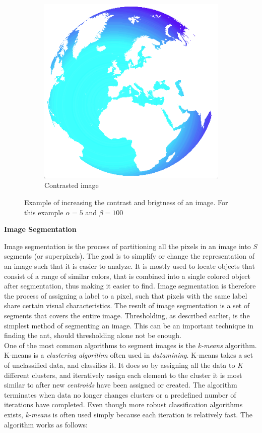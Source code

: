 \begin{figure}
\begin{subfigure}[b]{0.3\textwidth}
                \includegraphics[scale = 0.2]{img/globeContrast}
                \caption{Contrasted image}
        \end{subfigure}
		\caption{Example of increasing the contrast and brigtness of an image. For this example $\alpha = 5$ and $\beta = 100$}
		\label{fig:bright_contrast}
\end{figure}

\noindent \textbf{Image Segmentation} \par
Image segmentation is the process of partitioning all the pixels in an image into \textit{S} segments (or superpixels). The goal is to simplify or change the representation of an image such that it is easier to analyze. It is mostly used to locate objects that consist of a range of similar colors, that is combined into a single colored object after segmentation, thus making it easier to find\cite{theory1}. Image segmentation is therefore the process of assigning a label to a pixel, such that pixels with the same label share certain visual characteristics. The result of image segmentation is a set of segments that covers the entire image. Thresholding, as described earlier, is the simplest method of segmenting an image. This can be an important technique in finding the ant, should thresholding alone not be enough.\\

One of the most common algorithms to segment images is the \textit{k-means} algorithm\cite{theory2}. K-means is a \textit{clustering algorithm} often used in \textit{datamining}. K-means takes a set of unclassified data, and classifies it. It does so by assigning all the data to \textit{K} different clusters, and iteratively assign each element to the cluster it is most similar to after new \textit{centroids} have been assigned or created. The algorithm terminates when data no longer changes clusters or a predefined number of iterations have completed. Even though more robust classification algorithms exists, \textit{k-means} is often used simply because each iteration is relatively fast. The algorithm works as follows:

